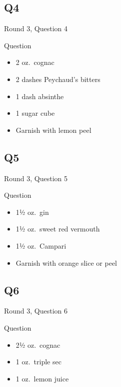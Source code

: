 \documentclass[11pt]{beamer}
\begin{document}
\subsection*{Q4}
\begin{frame}[t]{Round 3, Question 4}
\begin{block}{Question}
\begin{itemize}
\item 2 oz.\ cognac
\item 2 dashes Peychaud's bitters
\item 1 dash absinthe
\item 1 sugar cube
\item Garnish with lemon peel
\end{itemize}
\end{block}
\end{frame}
\subsection*{Q5}
\begin{frame}[t]{Round 3, Question 5}
\begin{block}{Question}
\begin{itemize}
\item 1½ oz.\ gin
\item 1½ oz.\ sweet red vermouth
\item 1½ oz.\ Campari
\item Garnish with orange slice or peel
\end{itemize}
\end{block}
\end{frame}
\subsection*{Q6}
\begin{frame}[t]{Round 3, Question 6}
\begin{block}{Question}
\begin{itemize}
\item 2½ oz.\ cognac
\item 1 oz.\ triple sec
\item 1 oz.\ lemon juice
\end{itemize}
\end{block}
\end{frame}
\end{document}
